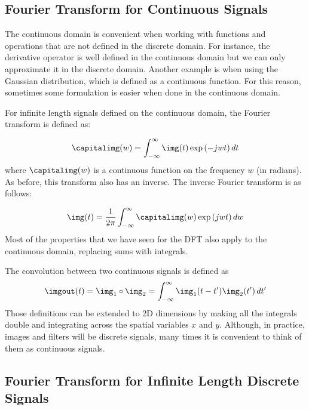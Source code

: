 \subsection{Fourier Transform for Continuous Signals}

The continuous domain is convenient when working with functions and operations that are not defined in the discrete domain. For instance, the derivative operator is well defined in the continuous domain but we can only approximate it in the discrete domain. Another example is when using the Gaussian distribution, which is defined as a continuous function. For this reason, sometimes some formulation is easier when done in the continuous domain. 

For infinite length signals defined on the continuous domain, the Fourier transform is defined as:

\begin{equation}
\capitalimg (w) =  \int_{-\infty}^{\infty} \img (t) \exp{ \left( - j w t \right)} \, dt 
\label{eq:contfourier}
\end{equation}
where $\capitalimg (w)$ is a continuous function on the frequency $w$ (in radians). As before, this transform also has an inverse. The inverse Fourier transform is as follows:

\begin{equation}
\img (t) = \frac{1}{2 \pi} \int_{-\infty}^{\infty} \capitalimg (w) \exp{ \left( j w t \right) } \, dw
\label{eq:invcontfourier}
\end{equation}
Most of the properties that we have seen for the DFT also apply to the continuous domain, replacing sums with integrals. 

The convolution between two continuous signals is defined as
\begin{equation}
\imgout (t) =  \img_1 \circ \img_2 = \int_{-\infty}^{\infty} \img_1 (t-t') \img_2(t') \, d t' 
\label{eq:contconv}
\end{equation}
Those definitions can be extended to 2D dimensions by making all the integrals double and integrating across the spatial variables $x$ and $y$. Although, in practice, images and filters will be discrete signals, many times it is convenient to think of them as continuous signals.



\subsection{Fourier Transform for Infinite Length Discrete Signals}

